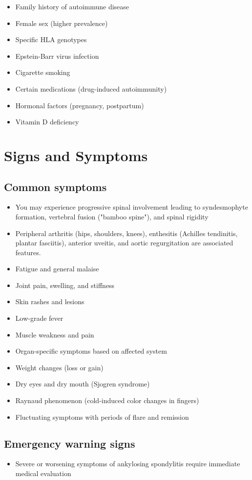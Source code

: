 \begin{itemize}[noitemsep]
  \item Family history of autoimmune disease
  \item Female sex (higher prevalence)
  \item Specific HLA genotypes
  \item Epstein-Barr virus infection
  \item Cigarette smoking
  \item Certain medications (drug-induced autoimmunity)
  \item Hormonal factors (pregnancy, postpartum)
  \item Vitamin D deficiency
\end{itemize}
\section{Signs and Symptoms}

\subsection{Common symptoms}
\begin{itemize}[noitemsep]
  \item You may experience progressive spinal involvement leading to syndesmophyte formation, vertebral fusion ("bamboo spine"), and spinal rigidity
  \item Peripheral arthritis (hips, shoulders, knees), enthesitis (Achilles tendinitis, plantar fasciitis), anterior uveitis, and aortic regurgitation are associated features.
  \item Fatigue and general malaise
  \item Joint pain, swelling, and stiffness
  \item Skin rashes and lesions
  \item Low-grade fever
  \item Muscle weakness and pain
  \item Organ-specific symptoms based on affected system
  \item Weight changes (loss or gain)
  \item Dry eyes and dry mouth (Sjogren syndrome)
  \item Raynaud phenomenon (cold-induced color changes in fingers)
  \item Fluctuating symptoms with periods of flare and remission
\end{itemize}

\subsection{Emergency warning signs}
\begin{itemize}[noitemsep]
  \item Severe or worsening symptoms of ankylosing spondylitis require immediate medical evaluation
\end{itemize}
